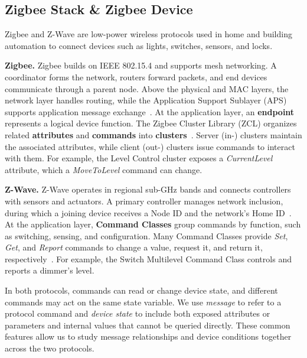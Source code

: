 \documentclass[10pt,journal,compsoc]{IEEEtran}
\begin{document}
\subsection{Zigbee Stack \& Zigbee Device}

Zigbee and Z-Wave are low-power wireless protocols used in home and building automation to connect devices such as lights, switches, sensors, and locks.

\textbf{Zigbee.} Zigbee builds on IEEE 802.15.4 and supports mesh networking. A coordinator forms the network, routers forward packets, and end devices communicate through a parent node. Above the physical and MAC layers, the network layer handles routing, while the Application Support Sublayer (APS) supports application message exchange~\cite{zigbeespecification}. At the application layer, an \textbf{endpoint} represents a logical device function. The Zigbee Cluster Library (ZCL) organizes related \textbf{attributes} and \textbf{commands} into \textbf{clusters}~\cite{zigbeezclr6}. Server (in-) clusters maintain the associated attributes, while client (out-) clusters issue commands to interact with them. For example, the Level Control cluster exposes a \emph{CurrentLevel} attribute, which a \emph{MoveToLevel} command can change.

\textbf{Z-Wave.} Z-Wave operates in regional sub-GHz bands and connects controllers with sensors and actuators. A primary controller manages network inclusion, during which a joining device receives a Node ID and the network's Home ID~\cite{zwavespec2024b}. At the application layer, \textbf{Command Classes} group commands by function, such as switching, sensing, and configuration. Many Command Classes provide \emph{Set}, \emph{Get}, and \emph{Report} commands to change a value, request it, and return it, respectively~\cite{zwaveccoverview}. For example, the Switch Multilevel Command Class controls and reports a dimmer's level.

In both protocols, commands can read or change device state, and different commands may act on the same state variable. We use \textit{message} to refer to a protocol command and \textit{device state} to include both exposed attributes or parameters and internal values that cannot be queried directly. These common features allow us to study message relationships and device conditions together across the two protocols.

\end{document}
